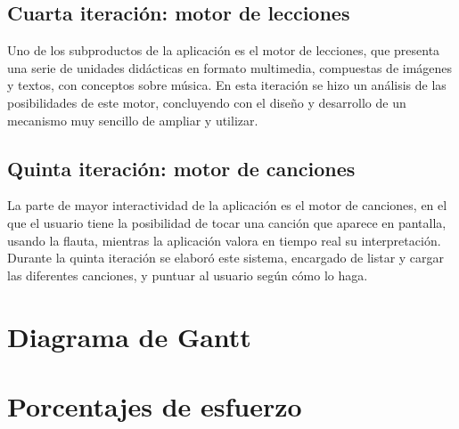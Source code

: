 \subsection{Cuarta iteración: motor de lecciones}
Uno de los subproductos de la aplicación es el motor de lecciones, que
presenta una serie de unidades didácticas en formato multimedia,
compuestas de imágenes y textos, con conceptos sobre música. En esta
iteración se hizo un análisis de las posibilidades de este motor,
concluyendo con el diseño y desarrollo de un mecanismo muy sencillo de
ampliar y utilizar.

\subsection{Quinta iteración: motor de canciones}
La parte de mayor interactividad de la aplicación es el motor de
canciones, en el que el usuario tiene la posibilidad de tocar una
canción que aparece en pantalla, usando la flauta, mientras la
aplicación valora en tiempo real su interpretación. Durante la quinta
iteración se elaboró este sistema, encargado de listar y cargar las
diferentes canciones, y puntuar al usuario según cómo lo haga.

\section{Diagrama de Gantt}

\section{Porcentajes de esfuerzo}